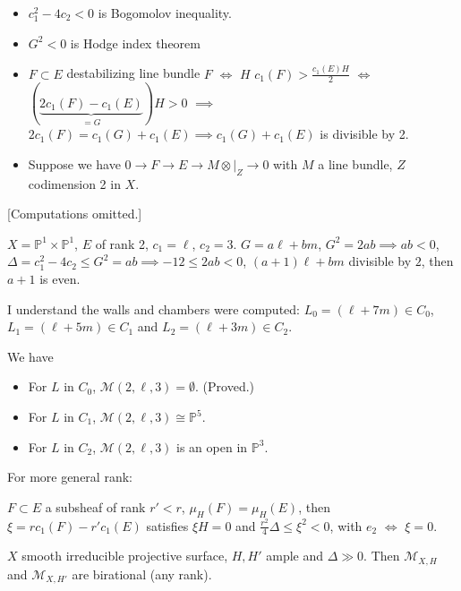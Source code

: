 \begin{remark}
\label{remark-remarks}
\begin{itemize}
\item $c_1^2-4c_2<0$ is Bogomolov inequality.
\item  $G^2<0$ is Hodge index theorem
\item $F \subset E$ destabilizing line bundle
$F$ $\iff$ $H$
$c_1(F)>\frac{c_1(E)H}{2}$ $\iff$
$(\underbrace{2c_1(F)-c_1(E)}_{=G})H>0$
$\implies$ $2c_1(F)=c_1(G)+c_1(E) \implies
c_1(G)+c_1(E)$ is divisible by 2.
\item Suppose we have $0 \to F \to E \to M
\otimes |_{Z}\to 0$ with $M$ a line
bundle, $Z$ codimension 2 in $X$.
\end{itemize}
\end{remark}

[Computations omitted.]

\begin{exercise}
\label{exercise-P1timesP1}
$X=\mathbb{P}^1\times \mathbb{P}^1$, $E$ of
rank 2, $c_1=\ell$, $c_2=3$.
$G=a\ell+bm$, $G^2=2ab \implies ab<0$,
$\Delta=c_1^2-4c_2\leq G^2=ab\implies
-12\leq 2ab<0$, $(a+1)\ell+bm$ divisible by
$2$, then $a+1$ is even.

I understand the walls and chambers were
computed:
$L_0=(\ell+7m)\in C_0$,
$L_1=(\ell+5m) \in C_1$ and $L_2=(\ell+3m)
\in C_2$.

We have
\begin{itemize}
\item For $L$ in  $C_0$,
$\mathcal{M}(2,\ell,3)=\emptyset$. (Proved.)
\item For $L$ in $C_1$,
$\mathcal{M}(2,\ell,3)\cong \mathbb{P}^5$.
\item For $L$ in $C_2$,
$\mathcal{M}(2,\ell,3)$ is an open in
$\mathbb{P}^3$.
\end{itemize}
\end{exercise}

For more general rank:

\begin{theorem}
\label{theorem-general-rank}
$F \subset E$ a subsheaf of rank $r'<r$,
$\mu_H(F)=\mu_H(E)$, then
$\xi=rc_1(F)-r'c_1(E)$ satisfies $\xi H=0$
and
$\frac{r^2}{4}\Delta \leq \xi^2<0$, with
$e_2$ $\iff$ $\xi=0$.
\end{theorem}

\begin{theorem}
\label{msos-label-015}
$X$ smooth irreducible projective surface,
$H,H'$ ample and $\Delta\gg 0$. Then
$\mathcal{M}_{X,H}$ and $\mathcal{M}_{X,H'}$
are birational (any rank).
\end{theorem}

